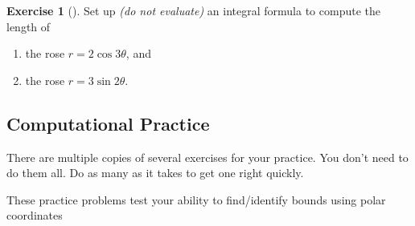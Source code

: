 \documentclass[10pt,]{book}
\theoremstyle{plain}
\theoremstyle{definition}
\theoremstyle{definition}
\theoremstyle{definition}
\theoremstyle{definition}
\newtheorem{exploration}[project]{Exercise}
\theoremstyle{definition}
\numberwithin{equation}{section}
\begin{document}
\begin{exploration}[]\label{exploration-97}
Set up \emph{(do not evaluate)} an integral formula to compute the length of%
\begin{enumerate}[font=\bfseries,label=(\alph*),ref=\alph*]
\item\label{task-158} the rose \(r=2\cos 3\theta\), and%
\item\label{task-159} the rose \(r=3\sin 2\theta\).%
\end{enumerate}
\end{exploration}
\typeout{************************************************}
\typeout{************************************************}
\subsection[{Computational Practice}]{Computational Practice}\label{exercises-7}
There are multiple copies of several exercises for your practice. You don't need to do them all. Do as many as it takes to get one right quickly.%
\hypertarget{exercisegroup-4}{}\par\noindent These practice problems test your ability to find/identify bounds using polar coordinates%
\end{document}
